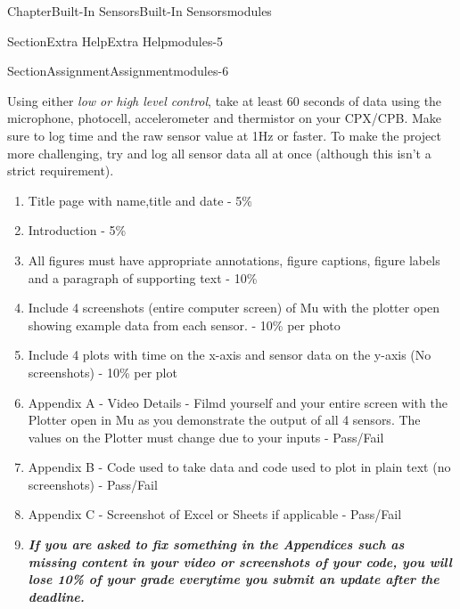 \documentclass[oneside,10pt,]{book}
\newcommand{\alert}[1]{\textbf{\textit{#1}}}
\numberwithin{equation}{section}
\begin{document}
\begin{chapterptx}{Chapter}{Built-In Sensors}{}{Built-In Sensors}{}{}{modules}
\begin{sectionptx}{Section}{Extra Help}{}{Extra Help}{}{}{modules-5}
\end{sectionptx}
%
%
\typeout{************************************************}
\typeout{************************************************}
%
\begin{sectionptx}{Section}{Assignment}{}{Assignment}{}{}{modules-6}
\begin{introduction}{}%
Using either \emph{low or high level control}, take at least 60 seconds of data using the microphone, photocell, accelerometer and thermistor on your CPX\slash{}CPB. Make sure to log time and the raw sensor value at 1Hz or faster. To make the project more challenging, try and log all sensor data all at once (although this isn't a strict requirement).%
%
\begin{enumerate}
\item{}Title page with name,title and date - 5\%%
\item{}Introduction - 5\%%
\item{}All figures must have appropriate annotations, figure captions, figure labels and a paragraph of supporting text - 10\%%
\item{}Include 4 screenshots (entire computer screen) of Mu with the plotter open showing example data from each sensor. - 10\% per photo%
\item{}Include 4 plots with time on the x-axis and sensor data on the y-axis (No screenshots) - 10\% per plot%
\item{}Appendix A - Video Details - Filmd yourself and your entire screen with the Plotter open in Mu as you demonstrate the output of all 4 sensors. The values on the Plotter must change due to your inputs - Pass\slash{}Fail%
\item{}Appendix B - Code used to take data and code used to plot in plain text (no screenshots) - Pass\slash{}Fail%
\item{}Appendix C - Screenshot of Excel or Sheets if applicable - Pass\slash{}Fail%
\item{}\alert{If you are asked to fix something in the Appendices such as missing content in your video or screenshots of your code, you will lose 10\% of your grade everytime you submit an update after the deadline.}%
\end{enumerate}
\end{introduction}%
\end{sectionptx}
\end{chapterptx}
%
%
\typeout{************************************************}
\end{document}
